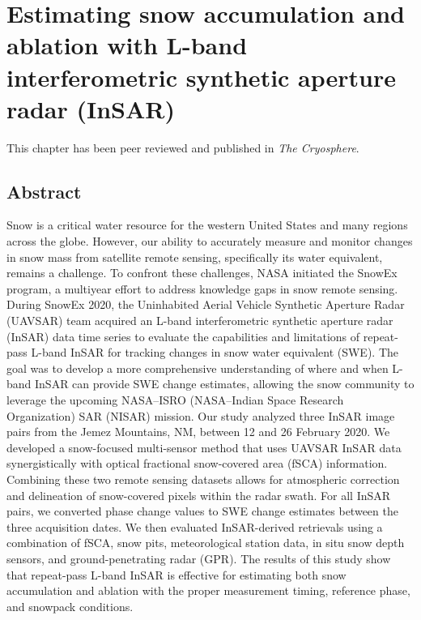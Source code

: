 \hypertarget{ch3}{%
\chapter{Estimating snow accumulation and ablation with L-band interferometric synthetic aperture radar (InSAR)}\label{ch3}}

This chapter has been peer reviewed and published in \emph{The Cryosphere}.



\hypertarget{ch3-abstract}{\section{Abstract}\label{ch3-abstract}}
Snow is a critical water resource for the western United States and many regions across the globe. However, our ability to accurately measure and monitor changes in snow mass from satellite remote sensing, specifically its water equivalent, remains a challenge. To confront these challenges, NASA initiated the SnowEx program, a multiyear effort to address knowledge gaps in snow remote sensing. During SnowEx 2020, the Uninhabited Aerial Vehicle Synthetic Aperture Radar (UAVSAR) team acquired an L-band interferometric synthetic aperture radar (InSAR) data time series to evaluate the capabilities and limitations of repeat-pass L-band InSAR for tracking changes in snow water equivalent (SWE). The goal was to develop a more comprehensive understanding of where and when L-band InSAR can provide SWE change estimates, allowing the snow community to leverage the upcoming NASA--ISRO (NASA--Indian Space Research Organization) SAR (NISAR) mission. Our study analyzed three InSAR image pairs from the Jemez Mountains, NM, between 12 and 26 February 2020. We developed a snow-focused multi-sensor method that uses UAVSAR InSAR data synergistically with optical fractional snow-covered area (fSCA) information. Combining these two remote sensing datasets allows for atmospheric correction and delineation of snow-covered pixels within the radar swath. For all InSAR pairs, we converted phase change values to SWE change estimates between the three acquisition dates. We then evaluated InSAR-derived retrievals using a combination of fSCA, snow pits, meteorological station data, in situ snow depth sensors, and ground-penetrating radar (GPR). The results of this study show that repeat-pass L-band InSAR is effective for estimating both snow accumulation and ablation with the proper measurement timing, reference phase, and snowpack conditions.

